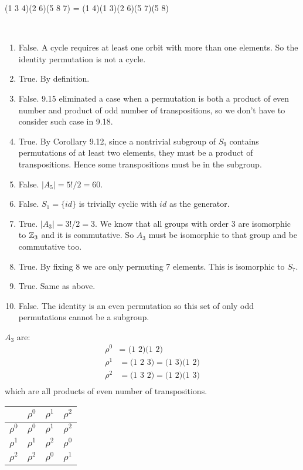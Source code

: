\documentclass[12pt]{article}
\begin{document}
\begin{problem}[9.11]
	(1 3 4)(2 6)(5 8 7) = (1 4)(1 3)(2 6)(5 7)(5 8)
\end{problem}
\begin{problem}[9.23]
~\begin{enumerate}[label=\alph*)]
	\item False. A cycle requires at least one orbit with more than one elements. So the identity permutation is not a cycle.
	\item True. By definition.
	\item False. 9.15 eliminated a case when a permutation is both a product of even number and product of odd number of transpositions, so we don't have to consider such case in 9.18. 
	\item True. By Corollary 9.12, since a nontrivial subgroup of $ S_9$ contains permutations of at least two elements, they must be a product of transpositions. Hence some transpositions must be in the subgroup.
	\item False. $ |A_5|=5!/2=60$.
	\item False. $ S_1 = \{id\} $ is trivially cyclic with $ id$ as the generator.
	\item True.  $ |A_3|=3!/2=3$. We know that all groups with order 3 are isomorphic to $ \mathbb{Z}_3$ and it is commutative. So $ A_3$ must be isomorphic to that group and be commutative too.
	\item True. By fixing 8 we are only permuting 7 elements. This is isomorphic to $ S_7$.
	\item True. Same as above.
	\item False. The identity is an even permutation so this set of only odd permutations cannot be a subgroup.
\end{enumerate}
\end{problem}
\begin{problem}[9.24]
	$ A_3$ are:
\begin{align*}
	\rho^0 &= \text{ (1 2)(1 2)}  \\
	\rho^1 &= \text{(1 2 3)} = \text{(1 3)(1 2)} \\
\rho^2 &= \text{(1 3 2)} = \text{(1 2)(1 3)}  \\
\end{align*}
which are all products of even number of transpositions.
\begin{table}[H]
	\centering
	\begin{tabular}{c||c|c|c}
	& $ \rho^0 $ & $ \rho^1$ & $ \rho^2$\\
	\hline
	\hline
		$ \rho^0 $& $ \rho^0$ & $ \rho^1$ & $ \rho^2$\\
		\hline
		$ \rho^1 $ & $ \rho^1$ & $ \rho^2$& $ \rho^0$\\
		\hline
		$ \rho^2 $ & $ \rho^2$& $ \rho^0$ & $ \rho^1$\\

	\end{tabular}
\end{table}
\end{problem}
\end{document}
